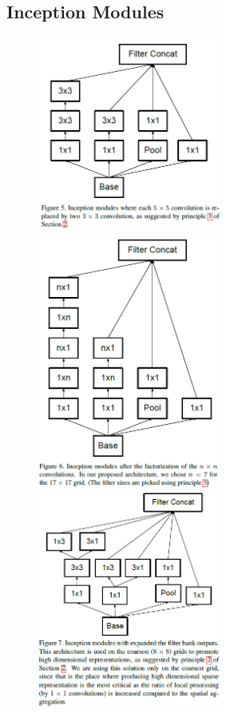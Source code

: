 \subsection{Inception Modules}

\begin{figure}[htbp]
    \centering

    \includegraphics[width=6cm]{images/models/inception_m1.png}
    \hspace{1in}
    \includegraphics[width=6cm]{images/models/inception_m2.png}
    \hspace{1in}
    \includegraphics[width=6cm]{images/models/inception_m3.png}

\end{figure}
